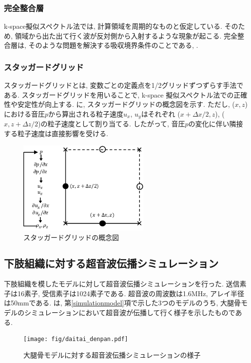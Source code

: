 \subsubsection{完全整合層}
k-space擬似スペクトル法では, 計算領域を周期的なものと仮定している. そのため, 領域から出た出て行く波が反対側から入射するような現象が起こる. 完全整合層は, そのような問題を解決する吸収境界条件のことである\cite{hayashisan[38]}, \cite{hayashisan[39]}. 
\subsubsection{スタッガードグリッド}
スタッガードグリッドとは, 変数ごとの定義点を1/2グリッドずつずらす手法である. スタッガードグリッドを用いることで, k-space 擬似スペクトル法での正確性や安定性が向上する\cite{hayashisan[42]}. に, スタッガードグリッドの概念図を示す. ただし, ($x, z$) における音圧$p$から算出される粒子速度$u_x$, $u_y$はそれぞれ ($x+\Delta x /2, z$),  ($x, z + \Delta z /2$)の粒子速度として割り当てる. したがって, 音圧$p$の変化に伴い隣接する粒子速度は直接影響を受ける. 
\begin{figure}[h]
  \begin{center}
    \includegraphics[width=65mm]{fig/stagado.pdf}
  \end{center}
  \caption{スタッガードグリッドの概念図}
\end{figure}
\subsection{下肢組織に対する超音波伝播シミュレーション}
下肢組織を模したモデルに対して超音波伝播シミュレーションを行った. 送信素子は16素子, 受信素子は1024素子である. 超音波の周波数は1.6MHz, アレイ半径は50mmである. は, 第\ref{simulationmodel}項で示した3つのモデルのうち, 大腿骨モデルのシミュレーションにおいて超音波が伝播して行く様子を示したものである. 
\begin{figure}[H]
  \begin{center}
    \texttt{[image: fig/daitai\_denpan.pdf]}
  \end{center}
  \caption{大腿骨モデルに対する超音波伝播シミュレーションの様子}
\end{figure}
